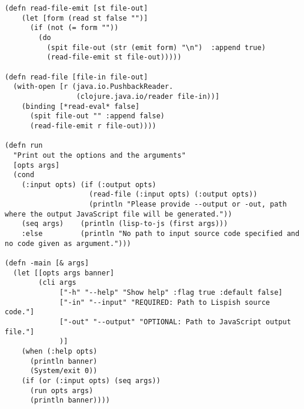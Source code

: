 \begin{verbatim}
(defn read-file-emit [st file-out]
    (let [form (read st false "")]
      (if (not (= form ""))
        (do
          (spit file-out (str (emit form) "\n")  :append true)
          (read-file-emit st file-out)))))

(defn read-file [file-in file-out]
  (with-open [r (java.io.PushbackReader.
                 (clojure.java.io/reader file-in))]
    (binding [*read-eval* false]
      (spit file-out "" :append false)
      (read-file-emit r file-out))))

(defn run
  "Print out the options and the arguments"
  [opts args]
  (cond
    (:input opts) (if (:output opts)
                    (read-file (:input opts) (:output opts))
                    (println "Please provide --output or -out, path where the output JavaScript file will be generated."))
    (seq args)    (println (lisp-to-js (first args)))
    :else         (println "No path to input source code specified and no code given as argument.")))

(defn -main [& args]
  (let [[opts args banner]
        (cli args
             ["-h" "--help" "Show help" :flag true :default false]
             ["-in" "--input" "REQUIRED: Path to Lispish source code."]
             ["-out" "--output" "OPTIONAL: Path to JavaScript output file."]
             )]
    (when (:help opts)
      (println banner)
      (System/exit 0))
    (if (or (:input opts) (seq args))
      (run opts args)
      (println banner))))
\end{verbatim}